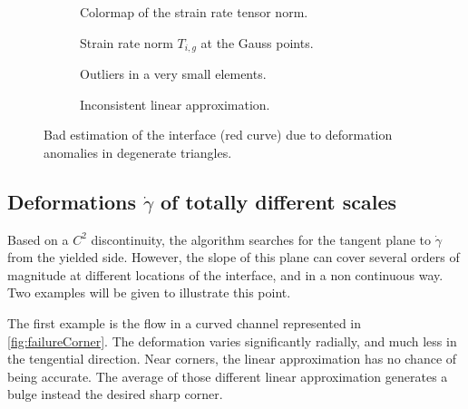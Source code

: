 \documentclass[11 pt]{report}
\begin{document}
\begin{figure}
    \centering
    \begin{subfigure}[t]{0.495\textwidth}
        
        \caption{Colormap of the strain rate tensor norm.}
    \end{subfigure}
    \begin{subfigure}[t]{0.495\textwidth}
        
        \caption{Strain rate norm $T_{i,g}$ at the Gauss points.}
    \end{subfigure}\vspace{6pt}
    \begin{subfigure}[t]{0.495\textwidth}
        
        \caption{Outliers in a very small elements.}
    \end{subfigure}
    \begin{subfigure}[t]{0.495\textwidth}
        
        \caption{Inconsistent linear approximation.}
    \end{subfigure}\vspace{6pt}
    \caption{Bad estimation of the interface (red curve) due to deformation anomalies in degenerate triangles.}
    \label{fig:failureCap}
\end{figure}

\subsection{Deformations $\dot\gamma$ of totally different scales}
Based on a $C^2$ discontinuity, the algorithm searches for the tangent plane to $\dot \gamma$ from the yielded side. However, the slope of this plane can cover several orders of magnitude at different locations of the interface, and in a non continuous way. Two examples will be given to illustrate this point.

The first example is the flow in a curved channel represented in \cref{fig:failureCorner}. The deformation varies significantly radially, and much less in the tengential direction. Near corners, the linear approximation has no chance of being accurate. The average of those different linear approximation generates a bulge instead the desired sharp corner.
\end{document}
